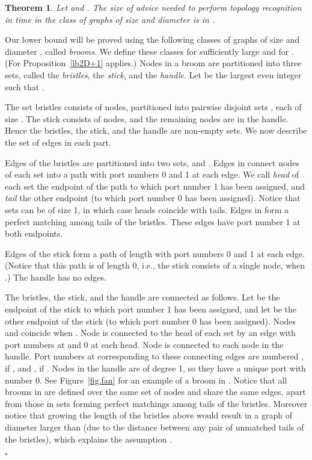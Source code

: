 \documentclass{article}
\newcommand*{\qed}{\hfill\ensuremath{\square}}
\newtheorem{theorem}{Theorem}[section]
\newenvironment{proof}{\noindent{\bf Proof:}}{\qed}
\begin{document}
\begin{theorem}\label{lbD+k}
Let  and .
The size of advice needed to perform topology recognition in time  in the class of graphs of size  and diameter 
is in .
\end{theorem}
\begin{proof}
Our lower bound will be proved using the following classes  of graphs of size  and diameter , called {\it brooms}.
We define these classes for  sufficiently large and for . {(For  Proposition~\ref{lb2D+1} applies.)}
Nodes in a  broom  are partitioned into three sets, called the {\em bristles}, the {\em stick}, and the {\em handle}.
Let  be the largest even integer such that .

The set  bristles consists of  nodes, partitioned into  pairwise disjoint sets , each of size . The stick consists of  nodes, and the remaining  nodes are in the handle.
Hence the bristles, the stick, and the handle are non-empty sets.
We now describe the set of edges in each part.

Edges of the bristles are partitioned into two sets,  and . 
Edges in  connect nodes of each set  into a path with port numbers 0 and 1 at each edge. We call  {\it head} of each set  the endpoint of the path to which port number 1 has been assigned, and {\it tail} the other  endpoint (to which port number 0 has been assigned).
Notice that sets  can be of size 1, in which case heads coincide with tails.
Edges in  form a perfect matching  among tails of the bristles. These edges have port number 1 at both endpoints. 

Edges of the stick form a path of length  with port numbers 0 and 1 at each edge. (Notice that this path is of length 0, i.e., the stick consists of a single node, when .) 
The handle has no edges.


The bristles, the stick, and the handle are connected as follows.
Let  be the endpoint of the stick to which port number 1 has been assigned, and let  be the other endpoint of the stick (to which port number 0 has been assigned). Nodes  and  coincide when .
Node  is connected to the head of each set  by an edge with port numbers  at  and 0 at each head.
Node  is connected to each node in the handle. Port numbers at  corresponding to these connecting edges are numbered , if , and 
, if . Nodes in the handle are of degree 1, so they have a unique port with number 0. See Figure~\ref{fig.fan} for an example of a broom in .
Notice that all brooms in  are defined over the same set of nodes and share the same edges, apart from those in sets forming perfect matchings among tails of the bristles. Moreover notice that growing the length of the bristles above  would result in a graph of diameter larger than  {(due to the distance between any pair of unmatched tails of the bristles)}, which explains the assumption .


\end{proof}
\end{document}
